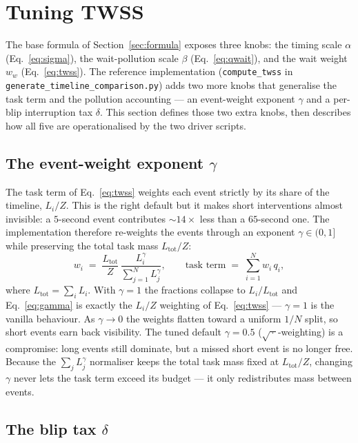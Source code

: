 \documentclass[11pt]{article}
\newcommand{\qi}{q_i}
\begin{document}
\section{Tuning TWSS}
\label{sec:tuning}

The base formula of Section~\ref{sec:formula} exposes three knobs:
the timing scale $\alpha$ (Eq.~\ref{eq:sigma}), the wait-pollution
scale $\beta$ (Eq.~\ref{eq:qwait}), and the wait weight $w_w$
(Eq.~\ref{eq:twss}). The reference implementation
(\texttt{compute\_twss} in
\texttt{generate\_timeline\_comparison.py}) adds two more knobs that
generalise the task term and the pollution accounting --- an
event-weight exponent $\gamma$ and a per-blip interruption tax
$\delta$. This section defines those two extra knobs, then describes
how all five are operationalised by the two driver scripts.

\subsection{The event-weight exponent $\gamma$}
\label{sec:gamma}

The task term of Eq.~\eqref{eq:twss} weights each event strictly by
its share of the timeline, $L_i / Z$. This is the right default but
it makes short interventions almost invisible: a $5$-second event
contributes $\sim 14\times$ less than a $65$-second one. The
implementation therefore re-weights the events through an exponent
$\gamma \in (0, 1]$ while preserving the total task mass $L_{\text{tot}}/Z$:
\begin{equation}
  w_i \;=\; \frac{L_{\text{tot}}}{Z}\,
            \frac{L_i^{\gamma}}{\sum_{j=1}^N L_j^{\gamma}},
  \qquad
  \text{task term} \;=\; \sum_{i=1}^N w_i\,\qi,
  \label{eq:gamma}
\end{equation}
where $L_{\text{tot}} = \sum_i L_i$. With $\gamma = 1$ the fractions
collapse to $L_i / L_{\text{tot}}$ and Eq.~\eqref{eq:gamma} is exactly
the $L_i / Z$ weighting of Eq.~\eqref{eq:twss} --- $\gamma = 1$ is the
vanilla behaviour. As $\gamma \to 0$ the weights flatten toward a
uniform $1/N$ split, so short events earn back visibility. The tuned
default $\gamma = 0.5$ ($\sqrt{\,\cdot\,}$-weighting) is a compromise:
long events still dominate, but a missed short event is no longer
free. Because the $\sum_j L_j^{\gamma}$ normaliser keeps the total
task mass fixed at $L_{\text{tot}}/Z$, changing $\gamma$ never lets the
task term exceed its budget --- it only redistributes mass between
events.

\subsection{The blip tax $\delta$}
\label{sec:delta}
\end{document}
